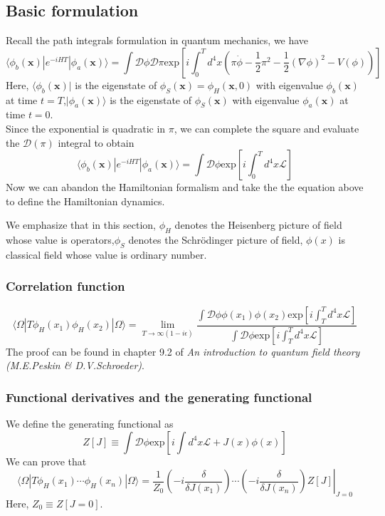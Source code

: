 \documentclass[cyan]{elegantnote}
\begin{document}
\subsection{Basic formulation}
\noindent
Recall the path integrals formulation in quantum mechanics, we have
\[\langle \phi_b(\bm{x}) | e^{-iHT} | \phi_a(\bm{x}) \rangle = \int \mathcal{D}\phi \mathcal{D}\pi  \mathrm{exp} \left[ i\int_0^T d^4x (\pi\dot{\phi} - \frac{1}{2}\pi^2 - \frac{1}{2}(\nabla \phi)^2 -V(\phi))\right]\]
Here, $\langle \phi_b(\bm{x}) |$ is the eigenstate of $\phi_S(\bm{x})=\phi_H(\bm{x},0)$ with eigenvalue $\phi_b(\bm{x})$ at time $t=T$,$| \phi_a(\bm{x}) \rangle$ is the eigenstate of $\phi_S(\bm{x})$ with eigenvalue $\phi_a(\bm{x})$ at time $t=0$.\\
Since the exponential is quadratic in $\pi$, we can complete the square and evaluate the $\mathcal{D}(\pi)$ integral to obtain
\[\langle \phi_b(\bm{x}) | e^{-iHT} | \phi_a(\bm{x}) \rangle = \int \mathcal{D}\phi  \mathrm{exp} \left[ i\int_0^T d^4x \mathcal{L} \right]\]
Now we can abandon the Hamiltonian formalism and take the the equation above to define the Hamiltonian dynamics.
\begin{note}
We emphasize that in this section, $\phi_H$ denotes the Heisenberg picture of field whose value is operators,$\phi_S$ denotes the Schr\"{o}dinger picture of field, $\phi(x)$ is classical field whose value is ordinary number.
\end{note}

\subsubsection{Correlation function}
\[\langle \Omega | T \phi_H(x_1) \phi_H(x_2)| \Omega \rangle = \lim_{T \to \infty(1-i\epsilon)} \frac{\int \mathcal{D}\phi \phi(x_1)\phi(x_2) \mathrm{exp} \left[ i\int_T^T d^4x \mathcal{L} \right]}{\int \mathcal{D} \phi \mathrm{exp} \left[ i\int_T^T d^4x \mathcal{L} \right]}\]
The proof can be found in chapter 9.2 of \emph{An introduction to quantum field theory (M.E.Peskin \& D.V.Schroeder)}.

\subsubsection{Functional derivatives and the generating functional}
\noindent
We define the generating functional as
\[Z[J] \equiv \int \mathcal{D} \phi \mathrm{exp} \left[ i\int d^4x \mathcal{L} + J(x)\phi(x) \right]\]
We can prove that
\[\langle \Omega | T \phi_H(x_1) \cdots \phi_H(x_n) | \Omega \rangle = \frac{1}{Z_0} \left. \left( -i\frac{\delta}{\delta J(x_1)} \right)\cdots \left( -i\frac{\delta}{\delta J(x_n)} \right) Z[J]\right|_{J=0}\]
Here, $Z_0 \equiv Z[J=0]$.
\end{document}
